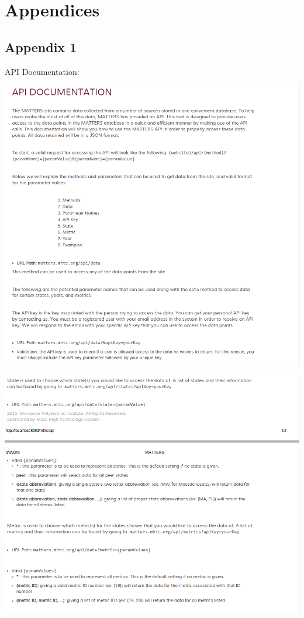 \chapter{Appendices}

\section{Appendix 1}

API Documentation:

\begin{center}
\includegraphics[width=0.9\linewidth]{images/docs1}
\end{center}

\begin{center}
\includegraphics[width=0.9\linewidth]{images/docs2}
\end{center}

